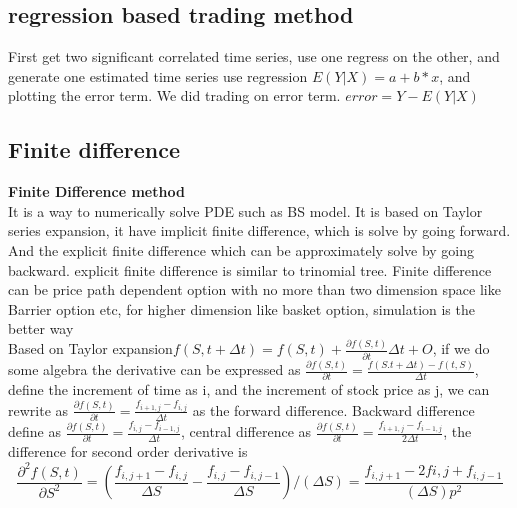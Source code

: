 \documentclass[a4paper,11pt]{article}
\begin{document}
\subsection{regression based trading method}
First get two significant correlated time series, use one regress on the other, and generate one estimated time series use regression $E(Y|X)=a+b*x$, and plotting the error term. We did trading on error term. $error=Y-E(Y|X)$





\subsection{Finite difference}
{\bf Finite Difference method}\\
It is a way to numerically solve PDE such as BS model. It is based on Taylor series expansion, it have implicit finite difference, which is solve by going forward. And the explicit finite difference which can be approximately solve by going backward. explicit finite difference is similar to trinomial tree. Finite difference can be price path dependent option with no more than two dimension space like Barrier option etc, for higher dimension like basket option, simulation is the better way \\
Based on Taylor expansion$f(S,t+\Delta t)=f(S,t)+\frac{\partial f(S,t)}{\partial t}\Delta t+O$, if we do some algebra the derivative can be expressed as
 $\frac{\partial f(S,t)}{\partial t}=\frac{f(S.t+\Delta t)-f(t,S)}{\Delta t}$, define the increment of time as i, and the increment of stock price as j, we can rewrite as $\frac{\partial f(S,t)}{\partial t}=\frac{f_{i+1,j}-f_{i,j}}{\Delta t} $ as the forward difference. Backward difference define as $\frac{\partial f(S,t)}{\partial t}=\frac{f_{i,j}-f_{i-1,j}}{\Delta t} $, central difference as $\frac{\partial f(S,t)}{\partial t}=\frac{f_{i+1,j}-f_{i-1,j}}{2\Delta t}$, the difference for second order derivative is $$ \frac{\partial^2 f(S,t)}{\partial S^2}=\left(\frac{f_{i,j+1}-f_{i,j}}{\Delta S}-\frac{f_{i,j}-f_{i,j-1}}{\Delta S}\right)/(\Delta S)=\frac{f_{i,j+1}-2f{i,j}+f_{i,j-1}}{(\Delta S)p^2}$$
\end{document}
